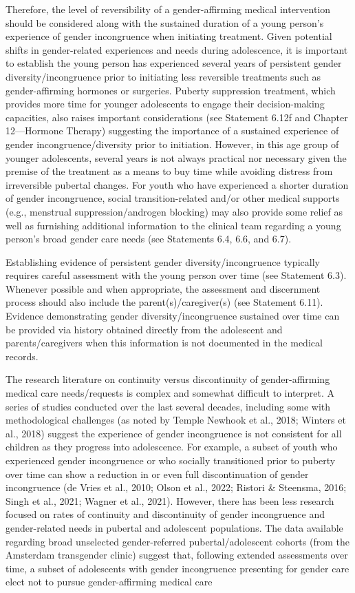 \documentclass[
]{book}
\begin{document}
Therefore, the level of reversibility of a
gender-affirming medical intervention should be
considered along with the sustained duration of
a young person's experience of gender incongruence when initiating treatment. Given potential shifts in gender-related experiences and
needs during adolescence, it is important to
establish the young person has experienced several years of persistent gender diversity/incongruence prior to initiating less reversible
treatments such as gender-affirming hormones
or surgeries. Puberty suppression treatment,
which provides more time for younger adolescents to engage their decision-making capacities,
also raises important considerations (see
Statement 6.12f and Chapter 12---Hormone
Therapy) suggesting the importance of a sustained experience of gender incongruence/diversity prior to initiation. However, in this age
group of younger adolescents, several years is
not always practical nor necessary given the
premise of the treatment as a means to buy time
while avoiding distress from irreversible pubertal
changes. For youth who have experienced a
shorter duration of gender incongruence, social
transition-related and/or other medical supports
(e.g., menstrual suppression/androgen blocking)
may also provide some relief as well as furnishing additional information to the clinical team
regarding a young person's broad gender care
needs (see Statements 6.4, 6.6, and 6.7).

Establishing evidence of persistent gender
diversity/incongruence typically requires careful
assessment with the young person over time (see
Statement 6.3). Whenever possible and when
appropriate, the assessment and discernment process should also include the parent(s)/caregiver(s)
(see Statement 6.11). Evidence demonstrating
gender diversity/incongruence sustained over time
can be provided via history obtained directly
from the adolescent and parents/caregivers when
this information is not documented in the medical records.

The research literature on continuity versus
discontinuity of gender-affirming medical care
needs/requests is complex and somewhat difficult to interpret. A series of studies conducted
over the last several decades, including some
with methodological challenges (as noted by
Temple Newhook et al., 2018; Winters et al.,
2018) suggest the experience of gender incongruence is not consistent for all children as they
progress into adolescence. For example, a subset
of youth who experienced gender incongruence
or who socially transitioned prior to puberty
over time can show a reduction in or even full
discontinuation of gender incongruence (de
Vries et al., 2010; Olson et al., 2022; Ristori \&
Steensma, 2016; Singh et al., 2021; Wagner et al.,
2021). However, there has been less research
focused on rates of continuity and discontinuity
of gender incongruence and gender-related needs
in pubertal and adolescent populations. The data
available regarding broad unselected
gender-referred pubertal/adolescent cohorts
(from the Amsterdam transgender clinic) suggest
that, following extended assessments over time,
a subset of adolescents with gender incongruence presenting for gender care elect not to
pursue gender-affirming medical care
\end{document}
